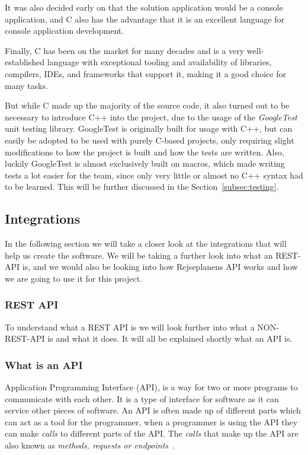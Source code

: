 It was also decided early on that the solution application would be a console application, and C also has the advantage
that it is an excellent language for console application development.

Finally, C has been on the market for many decades and is a very well-established language with exceptional tooling and
availability of libraries, compilers, IDEs, and frameworks that support it, making it a good choice for many tasks.

But while C made up the majority of the source code, it also turned out to be necessary to introduce C++ into the
project, due to the usage of the \textit{GoogleTest} unit testing library.
GoogleTest is originally built for usage with C++, but can easily be adopted to be used with purely C-based projects,
only requiring slight modifications to how the project is built and how the tests are written.
Also, luckily GoogleTest is almost exclusively built on macros, which made writing tests a lot easier for the team,
since only very little or almost no C++ syntax had to be learned.
This will be further discussed in the Section~\ref{subsec:testing}.

\subsection{Integrations}\label{subsec:integrations}

In the following section we will take a closer look at the integrations that will help us create the software.
We will be taking a further look into what an REST-API is, and we would also be looking into how Rejseplanens API works
and how we are going to use it for this project.

\subsubsection{\uppercase{Rest API}}\label{subsubsec:rest-api}

To understand what a REST API is we will look further into what a NON-REST-API is and what it does.
It will all be explained shortly what an API is.

\subsubsection{What is an API}\label{subsubsec:what-is-an-api}

Application Programming Interface (API), is a way for two or more programs to communicate with each other.
It is a type of interface for software as it can service other pieces of software.
An API is often made up of different parts which can act as a tool for the programmer, when a programmer is using the
API they can make \textit{calls} to different parts of the API\@.
The \textit{calls} that make up the API are also known as \textit{methods, requests or endpoints}~\cite{APIwiki}.

